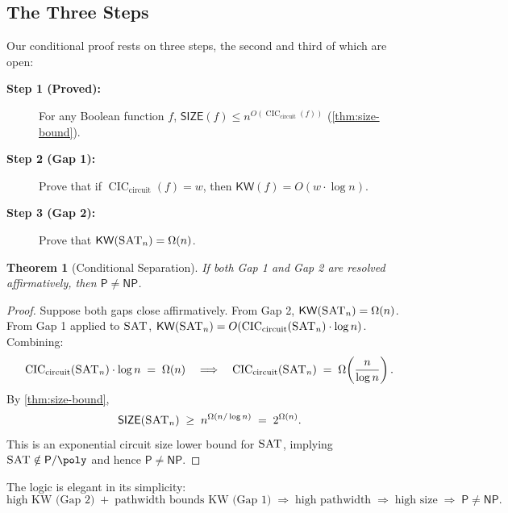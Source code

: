 \documentclass[11pt]{article}
\theoremstyle{plain}
\newtheorem{theorem}{Theorem}[section]
\theoremstyle{definition}
\newcommand{\CIC}{\operatorname{CIC}}
\newcommand{\CICcirc}{\CIC_{\text{circuit}}}
\newcommand{\SAT}{\textsc{SAT}}
\newcommand{\SIZE}{\mathsf{SIZE}}
\newcommand{\KW}{\mathsf{KW}}
\newcommand{\Pclass}{\mathsf{P}}
\newcommand{\NP}{\mathsf{NP}}
\begin{document}
\subsection{The Three Steps}

Our conditional proof rests on three steps, the second and third of which are open:

\begin{description}
    \item[\textbf{Step 1 (Proved):}] For any Boolean function $f$, $\SIZE(f) \leq n^{O(\CICcirc(f))}$ (\cref{thm:size-bound}).
    
    \item[\textbf{Step 2 (Gap 1):}] Prove that if $\CICcirc(f) = w$, then $\KW(f) = O(w \cdot \log n)$.
    
    \item[\textbf{Step 3 (Gap 2):}] Prove that $\KW(\SAT_n) = \Omega(n)$.
\end{description}

\begin{theorem}[Conditional Separation]\label{thm:conditional}
If both Gap 1 and Gap 2 are resolved affirmatively, then $\Pclass \neq \NP$.
\end{theorem}

\begin{proof}
Suppose both gaps close affirmatively. From Gap 2, $\KW(\SAT_n) = \Omega(n)$. From Gap 1 applied to $\SAT$, $\KW(\SAT_n) = O(\CICcirc(\SAT_n) \cdot \log n)$. Combining:
\[
\CICcirc(\SAT_n) \cdot \log n \;=\; \Omega(n)
\quad\Longrightarrow\quad
\CICcirc(\SAT_n) \;=\; \Omega\!\left(\frac{n}{\log n}\right).
\]
By \cref{thm:size-bound},
\[
\SIZE(\SAT_n) \;\geq\; n^{\Omega(n / \log n)} \;=\; 2^{\Omega(n)}.
\]
This is an exponential circuit size lower bound for $\SAT$, implying $\SAT \notin \Pclass/\poly$ and hence $\Pclass \neq \NP$.
\end{proof}

The logic is elegant in its simplicity:
\[
\text{high KW (Gap 2)} \;+\; \text{pathwidth bounds KW (Gap 1)} \;\Longrightarrow\; \text{high pathwidth} \;\Longrightarrow\; \text{high size} \;\Longrightarrow\; \Pclass \neq \NP.
\]
\end{document}
